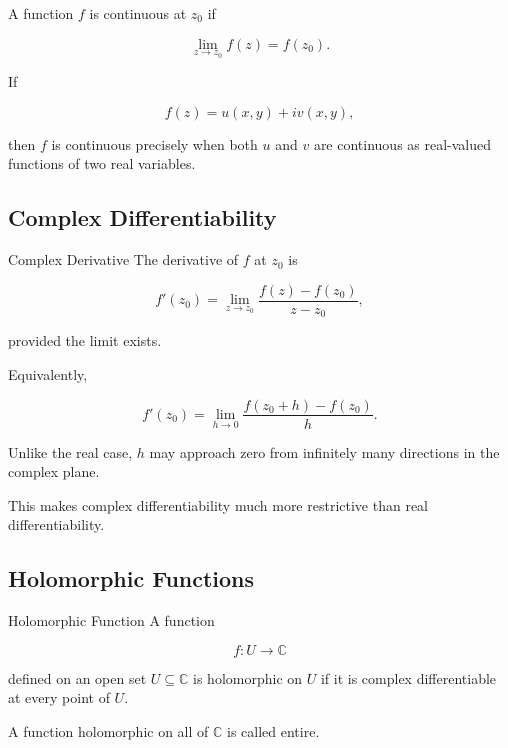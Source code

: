 A function \(f\) is continuous at \(z_0\) if

\[
\boxed{
\lim_{z\to z_0}f(z)
=
f(z_0).
}
\]

If

\[
f(z)=u(x,y)+iv(x,y),
\]

then \(f\) is continuous precisely when both \(u\) and \(v\) are
continuous as real-valued functions of two real variables.

\subsection{Complex Differentiability}
\label{subsec:complex-differentiability}

\begin{definitionbox}{Complex Derivative}
The derivative of \(f\) at \(z_0\) is

\[
\boxed{
f'(z_0)
=
\lim_{z\to z_0}
\frac{f(z)-f(z_0)}
{z-z_0},
}
\]

provided the limit exists.
\end{definitionbox}

Equivalently,

\[
\boxed{
f'(z_0)
=
\lim_{h\to0}
\frac{f(z_0+h)-f(z_0)}{h}.
}
\]

Unlike the real case, \(h\) may approach zero from infinitely many
directions in the complex plane.

This makes complex differentiability much more restrictive than real
differentiability.

\subsection{Holomorphic Functions}
\label{subsec:holomorphic-functions}

\begin{definitionbox}{Holomorphic Function}
A function

\[
f:U\to\mathbb{C}
\]

defined on an open set \(U\subseteq\mathbb{C}\) is holomorphic on \(U\) if
it is complex differentiable at every point of \(U\).
\end{definitionbox}

A function holomorphic on all of \(\mathbb{C}\) is called entire.


